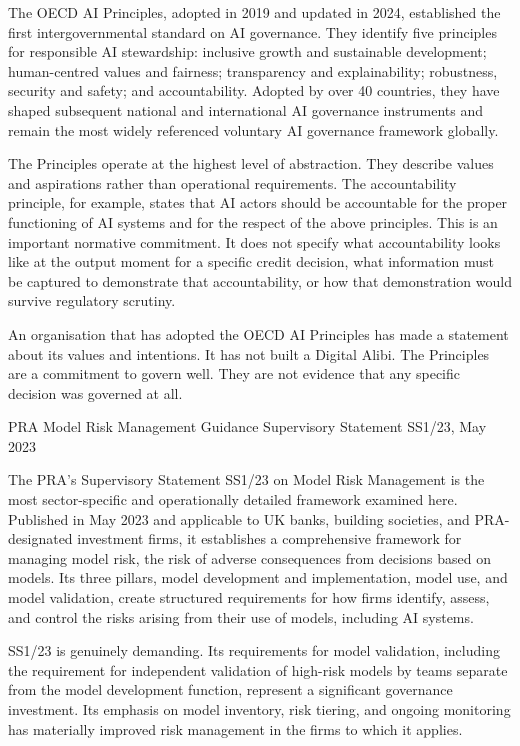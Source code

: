 The OECD AI Principles, adopted in 2019 and updated in 2024, established the first intergovernmental standard on AI governance. They identify five principles for responsible AI stewardship: inclusive growth and sustainable development; human-centred values and fairness; transparency and explainability; robustness, security and safety; and accountability. Adopted by over 40 countries, they have shaped subsequent national and international AI governance instruments and remain the most widely referenced voluntary AI governance framework globally.

The Principles operate at the highest level of abstraction. They describe values and aspirations rather than operational requirements. The accountability principle, for example, states that AI actors should be accountable for the proper functioning of AI systems and for the respect of the above principles. This is an important normative commitment. It does not specify what accountability looks like at the output moment for a specific credit decision, what information must be captured to demonstrate that accountability, or how that demonstration would survive regulatory scrutiny.

An organisation that has adopted the OECD AI Principles has made a statement about its values and intentions. It has not built a Digital Alibi. The Principles are a commitment to govern well. They are not evidence that any specific decision was governed at all.

PRA Model Risk Management Guidance Supervisory Statement SS1/23, May 2023

The PRA's Supervisory Statement SS1/23 on Model Risk Management is the most sector-specific and operationally detailed framework examined here. Published in May 2023 and applicable to UK banks, building societies, and PRA-designated investment firms, it establishes a comprehensive framework for managing model risk, the risk of adverse consequences from decisions based on models. Its three pillars, model development and implementation, model use, and model validation, create structured requirements for how firms identify, assess, and control the risks arising from their use of models, including AI systems.

SS1/23 is genuinely demanding. Its requirements for model validation, including the requirement for independent validation of high-risk models by teams separate from the model development function, represent a significant governance investment. Its emphasis on model inventory, risk tiering, and ongoing monitoring has materially improved risk management in the firms to which it applies.

